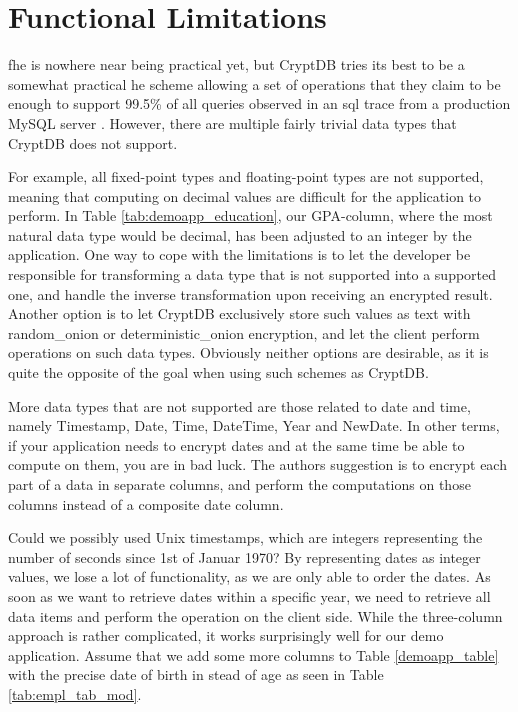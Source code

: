\section{Functional Limitations}
\label{sec:limits}

\gls{fhe} is nowhere near being practical yet, but CryptDB tries its best to be a somewhat practical \gls{he} scheme allowing a set of operations that they claim to be enough to support 99.5\% of all queries observed in an \gls{sql} trace from a production MySQL server \citep{CryptDB_Main_Paper}. However, there are multiple fairly trivial data types that CryptDB does not support.

For example, all fixed-point types and floating-point types are not supported, meaning that computing on decimal values are difficult for the application to perform. In Table \ref{tab:demoapp_education}, our GPA-column, where the most natural data type would be decimal, has been adjusted to an integer by the application. One way to cope with the limitations is to let the developer be responsible for transforming a data type that is not supported into a supported one, and handle the inverse transformation upon receiving an encrypted result. Another option is to let CryptDB exclusively store such values as text with \gls{random_onion} or \gls{deterministic_onion} encryption, and let the client perform operations on such data types. Obviously neither options are desirable, as it is quite the opposite of the goal when using such schemes as CryptDB. 

More data types that are not supported are those related to date and time, namely Timestamp, Date, Time, DateTime, Year and NewDate. In other terms, if your application needs to encrypt dates and at the same time be able to compute on them, you are in bad luck. The authors suggestion is to encrypt each part of a data in separate columns, and perform the computations on those columns instead of a composite date column.

Could we possibly used Unix timestamps, which are integers representing the number of seconds since 1st of Januar 1970? By representing dates as integer values, we lose a lot of functionality, as we are only able to order the dates. As soon as we want to retrieve dates within a specific year, we need to retrieve all data items and perform the operation on the client side. While the three-column approach is rather complicated, it works surprisingly well for our demo application. Assume that we add some more columns to Table \ref{demoapp_table} with the precise date of birth in stead of age as seen in Table \ref{tab:empl_tab_mod}.

